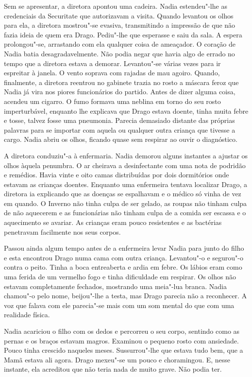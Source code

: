Sem se apresentar, a diretora apontou uma cadeira. Nadia estendeu"-lhe
as credenciais da Securitate que autorizavam a visita. Quando levantou
os olhos para ela, a diretora mostrou"-se evasiva, transmitindo a
impressão de que não fazia ideia de quem era Drago. Pediu"-lhe que esperasse e saiu da sala. A espera prolongou"-se, arrastando com ela qualquer
coisa de ameaçador. O coração de Nadia batia desagradavelmente. Não
podia negar que havia algo de errado no tempo que a diretora estava a
demorar. Levantou"-se várias vezes para ir espreitar à janela. O vento
soprava com rajadas de mau agoiro. Quando, finalmente, a diretora
reentrou no gabinete trazia no rosto a máscara feroz que Nadia já vira
nos piores funcionários do partido. Antes de dizer alguma coisa, acendeu
um cigarro. O fumo formava uma neblina em torno do seu rosto
imperturbável, enquanto lhe explicava que Drago estava doente, tinha
muita febre e tosse, talvez fosse uma pneumonia. Parecia demasiado
distante das próprias palavras para se importar com aquela ou qualquer
outra criança que tivesse a cargo. Nadia abriu os olhos, ficando quase
sem respirar ao ouvir o diagnóstico.

A diretora conduziu"-a à enfermaria. Nadia demorou
alguns instantes a ajustar os olhos àquela penumbra. O ar cheirava a
desinfectante com uma nota de podridão e remédios. Havia vinte e oito
camas distribuídas por dois dormitórios onde estavam as crianças
doentes. Enquanto uma enfermeira tentava localizar Drago, a diretora ia
explicando que as doenças se espalhavam e o médico só vinha de vez em
quando. O Inverno não tinha culpa de ser gelado, as roupas não tinham
culpa de não aquecerem e as funcionárias não tinham culpa de a comida
ser escassa e o aquecimento se avariar. As crianças eram pouco
resistentes e as bactérias penetravam facilmente nos seus corpos.

Passou ainda algum tempo antes de a enfermeira levar Nadia para junto do
filho e esta encontrou Drago numa
cama com outra criança. Levantou"-o e segurou"-o contra o peito. Tinha a
boca entreaberta e ardia em febre. Os lábios eram como uma ferida de um
vermelho fogo e tinha dificuldade em respirar. Os olhos não estavam
completamente fechados, mostrando uma meia"-lua branca. Nadia chamou"-o
pelo nome, beijou"-lhe a testa, mas Drago parecia não a reconhecer. A voz
que falava com ele parecia"-se mais com um som mental do que com uma
realidade física.

Nadia acariciou o filho com os dedos e percorreu o seu corpo, sentindo
como as pernas e os braços estavam magros. Examinou o pequeno rosto com
ansiedade. Pouco tinha crescido naqueles meses. Sussurrou"-lhe que estava
tudo bem, que a Mamã estava ali agora. Drago mexeu"-se um pouco e
choramingou. E, nesse instante, ela acreditou que não teria nada de
muito grave. Não podia ter.

